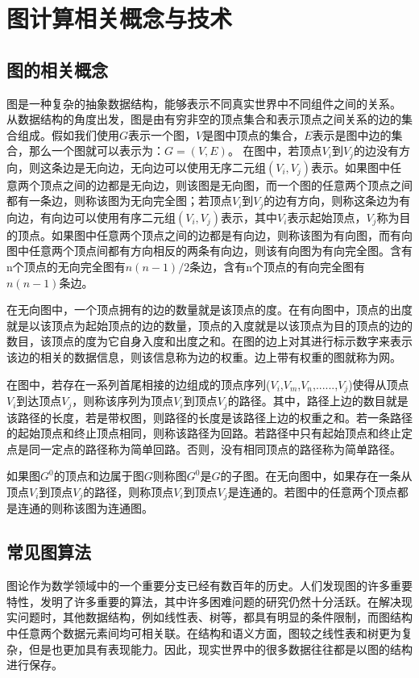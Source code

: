 
\chapter{图计算相关概念与技术}

\section{图的相关概念}
图是一种复杂的抽象数据结构，能够表示不同真实世界中不同组件之间的关系\cite{sunhuiquan2004}。
从数据结构的角度出发，图是由有穷非空的顶点集合和表示顶点之间关系的边的集合组成。假如我们使用$G$表示一个图，$V$是图中顶点的集合，$E$表示是图中边的集合，那么一个图就可以表示为：$G=(V,E)$。
在图中，若顶点$V_i$到$V_j$的边没有方向，则这条边是无向边，无向边可以使用无序二元组$(V_i,V_j)$表示。如果图中任意两个顶点之间的边都是无向边，则该图是无向图，而一个图的任意两个顶点之间都有一条边，则称该图为无向完全图；若顶点$V_i$到$V_j$的边有方向，则称这条边为有向边，有向边可以使用有序二元组$(V_i,V_j)$表示，其中$V_i$表示起始顶点，$V_j$称为目的顶点。如果图中任意两个顶点之间的边都是有向边，则称该图为有向图，而有向图中任意两个顶点间都有方向相反的两条有向边，则该有向图为有向完全图。含有n个顶点的无向完全图有$n(n-1)/2$条边，含有n个顶点的有向完全图有$n(n-1)$条边。

在无向图中，一个顶点拥有的边的数量就是该顶点的度。在有向图中，顶点的出度就是以该顶点为起始顶点的边的数量，顶点的入度就是以该顶点为目的顶点的边的数目，该顶点的度为它自身入度和出度之和。在图的边上对其进行标示数字来表示该边的相关的数据信息，则该信息称为边的权重。边上带有权重的图就称为网。

在图中，若存在一系列首尾相接的边组成的顶点序列($V_i$,$V_m$,$V_n$,......,$V_j$)使得从顶点$V_i$到达顶点$V_j$，则称该序列为顶点$V_i$到顶点$V_j$的路径。其中，路径上边的数目就是该路径的长度，若是带权图，则路径的长度是该路径上边的权重之和。若一条路径的起始顶点和终止顶点相同，则称该路径为回路。若路径中只有起始顶点和终止定点是同一定点的路径称为简单回路。否则，没有相同顶点的路径称为简单路径。

如果图$G^0$的顶点和边属于图$G$则称图$G^0$是$G$的子图。在无向图中，如果存在一条从顶点$V_i$到顶点$V_j$的路径，则称顶点$V_i$到顶点$V_j$是连通的。若图中的任意两个顶点都是连通的则称该图为连通图。


\section{常见图算法}
图论作为数学领域中的一个重要分支已经有数百年的历史。人们发现图的许多重要特性，发明了许多重要的算法，其中许多困难问题的研究仍然十分活跃。在解决现实问题时，其他数据结构，例如线性表、树等，都具有明显的条件限制，而图结构中任意两个数据元素间均可相关联。在结构和语义方面，图较之线性表和树更为复杂，但是也更加具有表现能力。因此，现实世界中的很多数据往往都是以图的结构进行保存。

